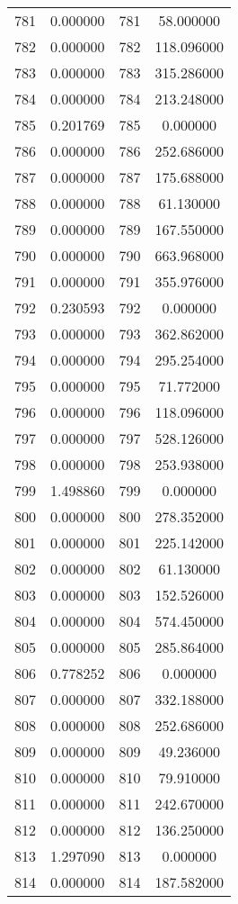 \documentclass[12pt]{article}
\begin{document}
\begin{longtable}{@{}cccc@{}}
781 & 0.000000 & 781 & 58.000000 \\
782 & 0.000000 & 782 & 118.096000 \\
783 & 0.000000 & 783 & 315.286000 \\
784 & 0.000000 & 784 & 213.248000 \\
785 & 0.201769 & 785 & 0.000000 \\
786 & 0.000000 & 786 & 252.686000 \\
787 & 0.000000 & 787 & 175.688000 \\
788 & 0.000000 & 788 & 61.130000 \\
789 & 0.000000 & 789 & 167.550000 \\
790 & 0.000000 & 790 & 663.968000 \\
791 & 0.000000 & 791 & 355.976000 \\
792 & 0.230593 & 792 & 0.000000 \\
793 & 0.000000 & 793 & 362.862000 \\
794 & 0.000000 & 794 & 295.254000 \\
795 & 0.000000 & 795 & 71.772000 \\
796 & 0.000000 & 796 & 118.096000 \\
797 & 0.000000 & 797 & 528.126000 \\
798 & 0.000000 & 798 & 253.938000 \\
799 & 1.498860 & 799 & 0.000000 \\
800 & 0.000000 & 800 & 278.352000 \\
801 & 0.000000 & 801 & 225.142000 \\
802 & 0.000000 & 802 & 61.130000 \\
803 & 0.000000 & 803 & 152.526000 \\
804 & 0.000000 & 804 & 574.450000 \\
805 & 0.000000 & 805 & 285.864000 \\
806 & 0.778252 & 806 & 0.000000 \\
807 & 0.000000 & 807 & 332.188000 \\
808 & 0.000000 & 808 & 252.686000 \\
809 & 0.000000 & 809 & 49.236000 \\
810 & 0.000000 & 810 & 79.910000 \\
811 & 0.000000 & 811 & 242.670000 \\
812 & 0.000000 & 812 & 136.250000 \\
813 & 1.297090 & 813 & 0.000000 \\
814 & 0.000000 & 814 & 187.582000 \\

\end{longtable}
\end{document}
